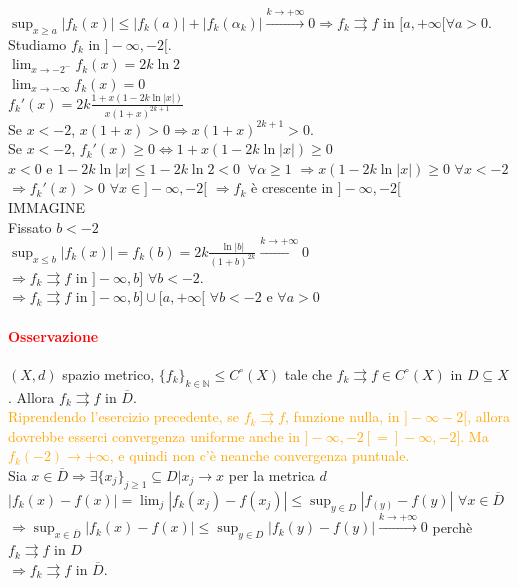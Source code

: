 \documentclass{article}
\newcommand{\N}{\mathbb{N}}
\begin{document}
$\sup_{x \geq a}|f_k(x)|\leq |f_k(a)|+|f_k(\alpha_k)|\xrightarrow{k \rightarrow +\infty} 0 \Rightarrow f_k \rightrightarrows f $ in $[a,+\infty[ \forall a >0$.\\
Studiamo $f_k$ in $]-\infty,-2[$.\\
$\lim_{x \rightarrow-2^-} f_k(x) = 2k\ln 2$\\
$\lim_{x \rightarrow-\infty}f_k(x) = 0 $\\
$f_k' (x) = 2k \frac{1+x(1-2k\ln|x|)}{x(1+x)^{2k+1}}$\\
Se $x <-2 $, $x(1+x)>0 \Rightarrow x(1+x)^{2k+1}>0$.\\
Se $x <-2$, $f_k'(x) \geq 0 \Leftrightarrow 1+x(1-2k\ln|x|)\geq 0$\\
$x <0$ e $1-2k\ln |x| \leq 1-2k\ln 2 <0\,\,\ \forall \alpha \geq 1$ $\Rightarrow x(1-2k\ln|x|)\geq 0 \,\, \forall x <-2$\\
$\Rightarrow f_k'(x) >0 \,\, \forall x \in ]-\infty,-2[$ $\Rightarrow f_k$ è crescente in $]-\infty,-2[$ \\
IMMAGINE\\
Fissato $b < -2$\\
$\sup_{x \leq b} |f_k(x)| = f_k(b)= 2k \frac{\ln |b|}{(1+b)^{2k}}\xrightarrow{k \rightarrow+\infty} 0$\\
$\Rightarrow f_k \rightrightarrows f$ in $]-\infty, b]\,\, \forall b < -2$.\\
$\Rightarrow f_k \rightrightarrows f$ in $]-\infty,b]\cup [a, +\infty[\,\, \forall b < -2$ e $\forall a >0$
 
\paragraph{\textcolor{red}{Osservazione}}
$(X,d)$ spazio metrico, $\{f_k\}_{k\in \N}\leq C^\circ(X)$ tale che $f_k \rightrightarrows f \in C^\circ (X)$ in $D \subseteq X$. Allora $f_k \rightrightarrows f$ in $\overline{D}$.\\
\textcolor{orange}{Riprendendo l'esercizio precedente, se $f_k \rightrightarrows f$, funzione nulla, in $]-\infty-2[$, allora dovrebbe esserci convergenza uniforme anche in $]-\infty,-2[=]-\infty,-2]$. Ma $f_k(-2)\rightarrow+\infty$, e quindi non c'è neanche convergenza puntuale.}\\
Sia $x \in \overline{D}\Rightarrow\exists \{ x_j\}_{j\geq 1} \subseteq D |x_j\rightarrow x$ per la metrica $d$\\
$|f_k(x)-f(x)|=\lim_{j}|f_k(x_j)-f(x_j)|\leq \sup_{y\in D}|f_(y)-f(y)|\,\, \forall x \in \overline{D}$\\
$\Rightarrow \sup_{x \in \overline{D}}|f_k(x)-f(x)|\leq \sup_{y \in D}|f_k(y)-f(y)| \xrightarrow{k \rightarrow+\infty} 0$ perchè $f_k \rightrightarrows f$ in $D$ \\
$\Rightarrow f_k \rightrightarrows f$ in $\overline{D}$.
\end{document}
